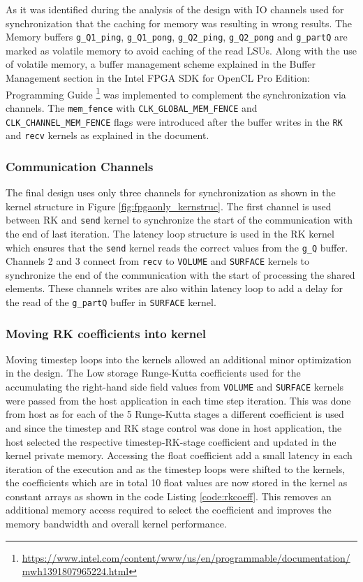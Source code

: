 As it was identified during the analysis of the design with IO channels used
for synchronization \label{sec:sync_iochan} that the caching for memory was resulting
in wrong results. The Memory buffers \texttt{g\_Q1\_ping}, \texttt{g\_Q1\_pong}, \texttt{g\_Q2\_ping},
\texttt{g\_Q2\_pong} and \texttt{g\_partQ} are marked as volatile memory to avoid
caching of the read \ac{LSU}s. Along with the use of volatile memory, a buffer management
scheme explained in the Buffer Management section in the Intel FPGA SDK for OpenCL Pro Edition: Programming Guide
\footnote{\url{https://www.intel.com/content/www/us/en/programmable/documentation/mwh1391807965224.html}}
was implemented to complement the synchronization via channels. The \texttt{mem\_fence}
with \texttt{CLK\_GLOBAL\_MEM\_FENCE} and \texttt{CLK\_CHANNEL\_MEM\_FENCE} flags were introduced
after the buffer writes in the \texttt{RK} and \texttt{recv} kernels as explained in the document.

\subsubsection*{Communication Channels}

The final design uses only three channels for synchronization as shown in the kernel
structure in Figure \ref{fig:fpgaonly_kernstruc}. The first channel is used between RK and
\texttt{send} kernel to synchronize the start of the communication with the end of last iteration.
The latency loop structure is used in the RK kernel which ensures that the \texttt{send}
kernel reads the correct values from the \texttt{g\_Q} buffer. Channels 2 and 3 connect from
\texttt{recv} to \texttt{VOLUME} and \texttt{SURFACE} kernels to synchronize the end of the
communication with the start of processing the shared elements. These channels writes are also within
latency loop to add a delay for the read of the \texttt{g\_partQ} buffer in \texttt{SURFACE} kernel.

\subsubsection*{Moving RK coefficients into kernel}
Moving timestep loops into the kernels allowed an additional minor optimization in the design.
The Low storage Runge-Kutta coefficients used for the accumulating the right-hand side field values from
\texttt{VOLUME} and \texttt{SURFACE} kernels were passed from the host application in each time step
iteration. This was done from host as for each of the 5 Runge-Kutta stages a different coefficient is used
and since the timestep and RK stage control was done in host application, the host selected the respective
timestep-RK-stage coefficient and updated in the kernel private memory. Accessing the float coefficient
add a small latency in each iteration of the execution and as the timestep loops were shifted to the kernels,
the coefficients which are in total 10 float values are now stored in the kernel as constant arrays as shown
in the code Listing \ref{code:rkcoeff}. This removes an additional memory access required to select the
coefficient and improves the memory bandwidth and overall kernel performance.

